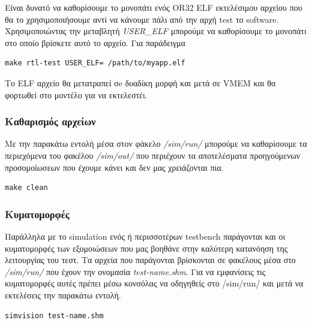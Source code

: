 \documentclass[a4paper,10pt]{article}
\numberwithin{figure}{section}
\numberwithin{table}{section}
\begin{document}
Είναι δυνατό να καθορίσουμε το μονοπάτι ενός OR32 ELF εκτελέσιμου αρχείου που θα το
χρησιμοποιήσουμε αντί να κάνουμε πάλι από την αρχή test το software. Χρησιμοποιώντας
την μεταβλητή \emph{USER\_ELF} μπορούμε να καθορίσουμε το μονοπάτι στο οποίο βρίσκετε
αυτό το αρχείο. Για παράδειγμα 
\vspace{0.7cm}
\begin{lstlisting}
make rtl-test USER_ELF= /path/to/myapp.elf
\end{lstlisting}
\vspace{0.7cm}
Το ELF αρχείο θα μετατραπεί σe δυαδίκη μορφή και μετά σε VMEM και θα φορτωθεί στο
μοντέλο για να εκτελεστέι.


\subsubsection{ Καθαρισμός αρχείων}


Με την παρακάτω εντολή  μέσα στον φάκελο \emph{/sim/run/} μπορούμε να καθαρίσουμε τα περιεχόμενα του φακέλου \emph{/sim/out/} που περιέχουν τα αποτελέσματα προηγούμενων
προσομοίωσεων που έχουμε κάνει και δεν μας χρειάζονται πια.
\vspace{0.7cm}
\begin{lstlisting}
make clean
\end{lstlisting}
\vspace{0.7cm}



\subsubsection{ Κυματομορφές}


Παράλληλα με το simulation ενός ή περισσοτέρων testbench παράγονται και οι κυματομορφές
των εξομοιώσεων που μας βοηθάνε στην καλύτερη κατανόηση της λειτουργίας του τεστ. Τα αρχεία που παράγονται
βρίσκονται σε φακέλους μέσα στο \emph{/sim/run/} που έχουν την ονομασία \emph{test-name.shm}. Για να
εμφανίσεις τις κυματομορφές αυτές πρέπει μέσω κονσόλας να οδηγηθείς στο /sim/run/ και
μετά να εκτελέσεις την παρακάτω εντολή.
\vspace{0.7cm}
\begin{lstlisting}
simvision test-name.shm
\end{lstlisting}
\vspace{0.7cm}
\end{document}
